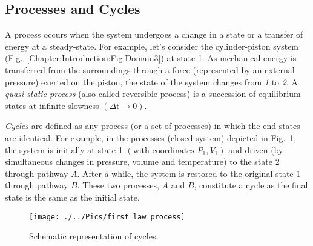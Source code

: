    \subsection{Processes and Cycles}\label{Chapter:Introduction:Section:Introduction:ProcessesCyclesDefinition}
   A process occurs when the system undergoes a change in a state or a transfer of energy at a steady-state. For example, let's consider the cylinder-piston system (Fig.~\ref{Chapter:Introduction:Fig:Domain3}) at state 1. As mechanical energy is transferred from the surroundings through a force (represented by an external pressure) exerted on the piston, the state of the system changes from {\it 1} to {\it 2}. A {\it quasi-static process} (also called reversible process) is a succession of equilibrium states at infinite slowness $\left(\Delta\text{t}\rightarrow\text{0}\right)$.
   
   {\it Cycles} are defined as any process (or a set of processes) in which the end states are identical. For example, in the processes (closed system) depicted in Fig.~\ref{Chapter:Introduction:Fig:CyclesSchematic}, the system is initially at state 1 $\left(\text{with coordinates } P_{1},V_{1}\right)$ and driven (by simultaneous changes in pressure, volume and temperature) to the state 2 through pathway $A$. After a while, the system is restored to the original state $1$ through pathway $B$. These two processes, $A$ and $B$, constitute a cycle as the final state is the same as the initial state.
   
   \begin{figure}[h]
     \begin{center}
        \texttt{[image: ./../Pics/first\_law\_process]}
        \caption{Schematic representation of cycles.}\label{Chapter:Introduction:Fig:CyclesSchematic}
     \end{center}
   \end{figure}
   
